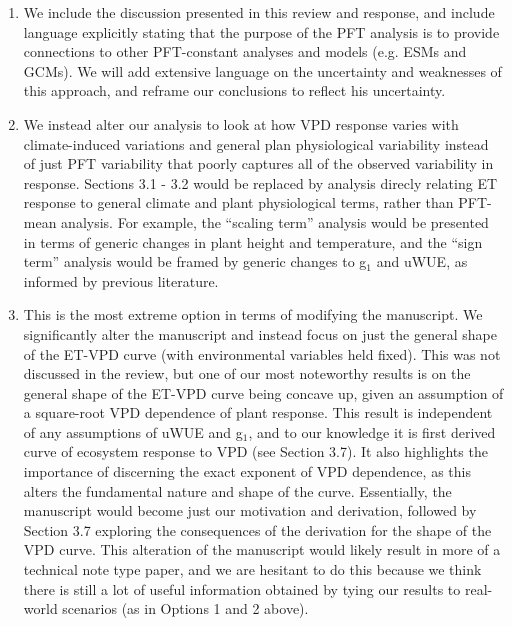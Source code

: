 \begin{enumerate}
\item We include the discussion presented in this review and response,
  and include language explicitly stating that the purpose of the PFT
  analysis is to provide connections to other PFT-constant analyses
  and models (e.g. ESMs and GCMs). We will add extensive language on
  the uncertainty and weaknesses of this approach, and reframe our
  conclusions to reflect his uncertainty.
\item We instead alter our analysis to look at how VPD response
  varies with climate-induced variations and general plan
  physiological variability instead of just PFT variability that
  poorly captures all of the observed variability in
  response. Sections 3.1 - 3.2 would be replaced by analysis direcly
  relating ET response to general climate and plant physiological
  terms, rather than PFT-mean analysis. For example, the ``scaling
  term'' analysis would be presented in terms of generic changes in
  plant height and temperature, and the ``sign term'' analysis would
  be framed by generic changes to g$_1$ and uWUE, as informed by
  previous literature.
\item This is the most extreme option in terms of modifying the
  manuscript. We significantly alter the manuscript and instead focus
  on just the general shape of the ET-VPD curve (with environmental
  variables held fixed). This was not discussed in the review, but one
  of our most noteworthy results is on the general shape of the ET-VPD
  curve being concave up, given an assumption of a square-root VPD
  dependence of plant response. This result is independent of any
  assumptions of uWUE and g$_1$, and to our knowledge it is first
  derived curve of ecosystem response to VPD (see Section 3.7). It
  also highlights the importance of discerning the exact exponent of
  VPD dependence, as this alters the fundamental nature and shape of
  the curve. Essentially, the manuscript would become just our
  motivation and derivation, followed by Section 3.7 exploring the
  consequences of the derivation for the shape of the VPD curve. This
  alteration of the manuscript would likely result in more of a
  technical note type paper, and we are hesitant to do this because we
  think there is still a lot of useful information obtained by tying
  our results to real-world scenarios (as in Options 1 and 2 above).
\end{enumerate}

